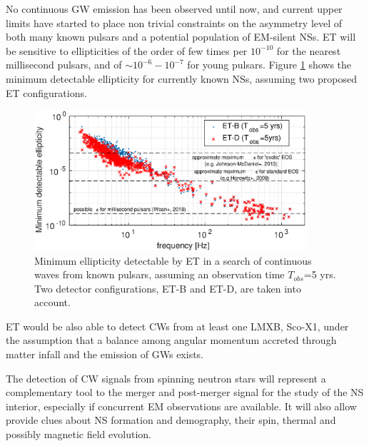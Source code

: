 No continuous GW emission has been observed until now, and current upper limits have started to place non trivial constraints on the asymmetry level of both many known pulsars and a potential population of EM-silent NSs. ET will be sensitive to ellipticities of the order of few times per $10^{-10}$ for the nearest millisecond pulsars, and of $\sim 10^{-6}-10^{-7}$ for young pulsars. Figure \ref{fig:et_eps} shows the minimum detectable ellipticity for currently known NSs, assuming two proposed ET configurations. 
\begin{figure}[h!]
\centering
\includegraphics[width=0.9\textwidth]{Figures/ET_eps.eps}
\caption{Minimum ellipticity detectable by ET in a search of continuous waves from known pulsars, assuming an observation time $T_{obs}$=5 yrs. Two detector configurations, ET-B and ET-D, are taken into account. 
}
\label{fig:et_eps}
\end{figure} 

ET would be also able to detect CWs from at least one LMXB, Sco-X1, under the assumption that a balance among angular momentum accreted through matter infall and the emission of GWs exists. 

The detection of CW signals from spinning neutron stars will represent a complementary tool to the merger and post-merger signal for the study of the NS interior, especially if concurrent EM observations are available. It will also allow provide clues about NS formation and demography, their spin, thermal and possibly magnetic field evolution.  

